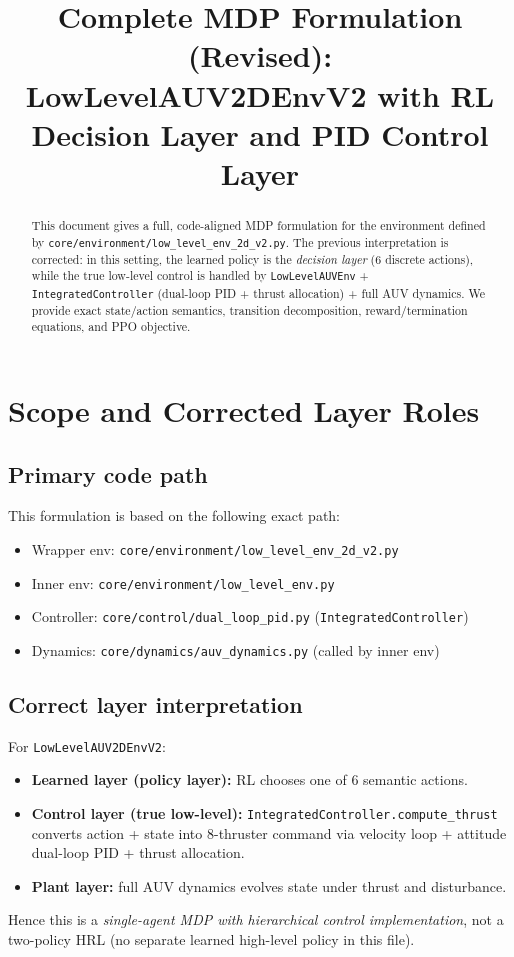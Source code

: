 \documentclass[11pt]{article}
\title{Complete MDP Formulation (Revised):\\
LowLevelAUV2DEnvV2 with RL Decision Layer and PID Control Layer}
\author{}
\date{}
\begin{document}
\maketitle

\begin{abstract}
This document gives a full, code-aligned MDP formulation for the environment defined by \texttt{core/environment/low\_level\_env\_2d\_v2.py}. The previous interpretation is corrected: in this setting, the learned policy is the \emph{decision layer} (6 discrete actions), while the true low-level control is handled by \texttt{LowLevelAUVEnv} + \texttt{IntegratedController} (dual-loop PID + thrust allocation) + full AUV dynamics. We provide exact state/action semantics, transition decomposition, reward/termination equations, and PPO objective.
\end{abstract}

\section{Scope and Corrected Layer Roles}

\subsection{Primary code path}
This formulation is based on the following exact path:
\begin{itemize}
  \item Wrapper env: \texttt{core/environment/low\_level\_env\_2d\_v2.py}
  \item Inner env: \texttt{core/environment/low\_level\_env.py}
  \item Controller: \texttt{core/control/dual\_loop\_pid.py} (\texttt{IntegratedController})
  \item Dynamics: \texttt{core/dynamics/auv\_dynamics.py} (called by inner env)
\end{itemize}

\subsection{Correct layer interpretation}
For \texttt{LowLevelAUV2DEnvV2}:
\begin{itemize}
  \item \textbf{Learned layer (policy layer):} RL chooses one of 6 semantic actions.
  \item \textbf{Control layer (true low-level):} \texttt{IntegratedController.compute\_thrust} converts action + state into 8-thruster command via velocity loop + attitude dual-loop PID + thrust allocation.
  \item \textbf{Plant layer:} full AUV dynamics evolves state under thrust and disturbance.
\end{itemize}
Hence this is a \emph{single-agent MDP with hierarchical control implementation}, not a two-policy HRL (no separate learned high-level policy in this file).
\end{document}
